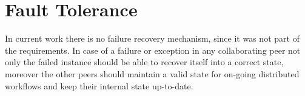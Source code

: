\section{Fault Tolerance}
In current work there is no failure recovery mechanism, since it was not part of the requirements. In case of a failure or exception in any 
collaborating peer not only the failed instance should be able to recover itself into a correct state, moreover the other peers should maintain
a valid state for on-going distributed workflows and keep their internal state up-to-date.